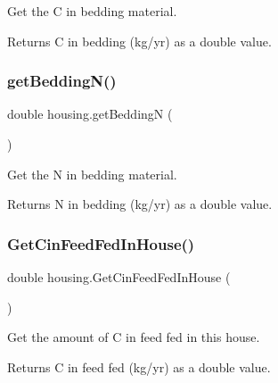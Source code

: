 Get the C in bedding material. 

\begin{DoxyReturn}{Returns}
C in bedding (kg/yr) as a double value. 
\end{DoxyReturn}
\mbox{\label{classhousing_af185cbf595b9482b20e13e12e0c82e64}} 
\subsubsection{\texorpdfstring{getBeddingN()}{getBeddingN()}}
{\footnotesize\ttfamily double housing.\+get\+BeddingN (\begin{DoxyParamCaption}{ }\end{DoxyParamCaption})\hspace{0.3cm}{\ttfamily [inline]}}



Get the N in bedding material. 

\begin{DoxyReturn}{Returns}
N in bedding (kg/yr) as a double value. 
\end{DoxyReturn}
\mbox{\label{classhousing_aa7dc2d7cb586625504b95939abb32748}} 
\subsubsection{\texorpdfstring{GetCinFeedFedInHouse()}{GetCinFeedFedInHouse()}}
{\footnotesize\ttfamily double housing.\+Get\+Cin\+Feed\+Fed\+In\+House (\begin{DoxyParamCaption}{ }\end{DoxyParamCaption})\hspace{0.3cm}{\ttfamily [inline]}}



Get the amount of C in feed fed in this house. 

\begin{DoxyReturn}{Returns}
C in feed fed (kg/yr) as a double value. 
\end{DoxyReturn}
\mbox{\label{classhousing_ae973f720e70941908e38c803568d5d6c}} 
